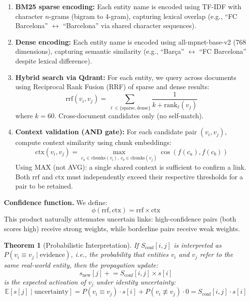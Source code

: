 \documentclass[11pt,a4paper]{article}
\newtheorem{theorem}{Theorem}
\begin{document}
\begin{enumerate}[leftmargin=*]
    \item \textbf{BM25 sparse encoding:} Each entity name is encoded using TF-IDF with character $n$-grams (bigram to 4-gram), capturing lexical overlap (e.g., ``FC Barcelona'' $\leftrightarrow$ ``Barcelona'' via shared character sequences).
    
    \item \textbf{Dense encoding:} Each entity name is encoded using all-mpnet-base-v2 (768 dimensions), capturing semantic similarity (e.g., ``Bar\c{c}a'' $\leftrightarrow$ ``FC Barcelona'' despite lexical difference).
    
    \item \textbf{Hybrid search via Qdrant:} For each entity, we query across documents using Reciprocal Rank Fusion (RRF) of sparse and dense results:
    \begin{equation}
        \text{rrf}(v_i, v_j) = \sum_{\ell \in \{\text{sparse}, \text{dense}\}} \frac{1}{k + \text{rank}_\ell(v_j)}
    \end{equation}
    where $k = 60$. Cross-document candidates only (no self-match).
    
    \item \textbf{Context validation (AND gate):} For each candidate pair $(v_i, v_j)$, compute context similarity using chunk embeddings:
    \begin{equation}
        \text{ctx}(v_i, v_j) = \max_{c_a \in \text{chunks}(v_i),\ c_b \in \text{chunks}(v_j)} \cos(f(c_a), f(c_b))
    \end{equation}
    Using MAX (not AVG): a single shared context is sufficient to confirm a link. Both $\text{rrf}$ and $\text{ctx}$ must independently exceed their respective thresholds for a pair to be retained.
\end{enumerate}

\textbf{Confidence function.} We define:
\begin{equation}
    \phi(\text{rrf}, \text{ctx}) = \text{rrf} \times \text{ctx}
\end{equation}
This product naturally attenuates uncertain links: high-confidence pairs (both scores high) receive strong weights, while borderline pairs receive weak weights.

\begin{theorem}[Probabilistic Interpretation]
\label{thm:bayesian}
If $S_{\text{conf}}[i,j]$ is interpreted as $P(v_i \equiv v_j \mid \text{evidence})$, i.e., the probability that entities $v_i$ and $v_j$ refer to the same real-world entity, then the propagation update:
\begin{equation}
    s_{\text{new}}[j] \mathrel{+}= S_{\text{conf}}[i,j] \times s[i]
\end{equation}
is the expected activation of $v_j$ under identity uncertainty:
\begin{equation}
    \mathbb{E}[s[j] \mid \text{uncertainty}] = P(v_i \equiv v_j) \cdot s[i] + P(v_i \not\equiv v_j) \cdot 0 = S_{\text{conf}}[i,j] \cdot s[i]
\end{equation}
\end{theorem}
\end{document}
